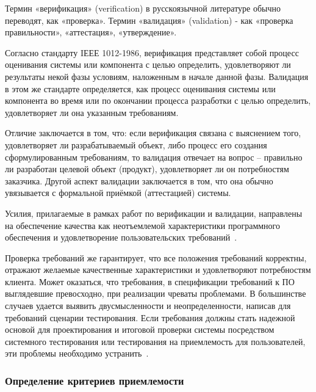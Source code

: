 \documentclass{../industrial-development}
\begin{document}
{\begin{frame}
\end{frame}
\lecturenotes

Термин \alert{«верификация» (verification)} в русскоязычной литературе обычно переводят, как «проверка». Термин \alert{«валидация» (validation)} - как «проверка правильности», «аттестация», «утверждение».

Согласно стандарту IЕЕЕ 1012-1986, верификация представляет собой процесс оценивания системы или компонента с целью определить, удовлетворяют ли результаты некой фазы условиям, наложенным в начале данной фазы. Валидация в этом же стандарте определяется, как процесс оценивания системы или компонента во время или по окончании процесса разработки с целью определить, удовлетворяет ли она
указанным требованиям.

Отличие заключается в том, что: если верификация связана с выяснением того, удовлетворяет ли разрабатываемый объект, либо
процесс его создания сформулированным требованиям, то валидация отвечает на вопрос – правильно ли разработан целевой объект (продукт), удовлетворяет ли он потребностям заказчика. Другой аспект валидации заключается в том, что она обычно увязывается с
формальной приёмкой (аттестацией) системы.

Усилия, прилагаемые в рамках
работ по верификации и валидации, направлены на обеспечение качества как неотъемлемой характеристики программного обеспечения и удовлетворение пользовательских требований~\cite[с.~64--65]{Maglinec}.

Проверка требований же гарантирует, что все положения требований корректны, отражают желаемые качественные характеристики и удовлетворяют потребностям клиента. Может оказаться, что требования, в спецификации требований к ПО выглядевшие превосходно, при реализации чреваты проблемами. В большинстве случаев удается выявить двусмысленности и неопределенности, написав для требований сценарии тестирования. Если требования должны стать надежной основой для проектирования и итоговой проверки системы посредством системного тестирования или тестирования на приемлемость для пользователей, эти проблемы необходимо устранить~\cite[с.~51]{Wiegers}.


\begin{frame} \frametitle {Определение критериев
приемлемости}


\end{frame}}
\end{document}
